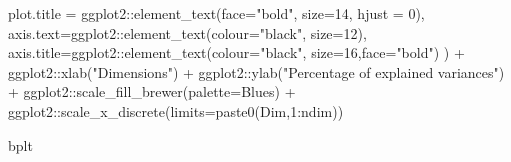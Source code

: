 \documentclass[
]{article}
\newenvironment{Shaded}{\begin{snugshade}}{\end{snugshade}}
\newcommand{\AttributeTok}[1]{\textcolor[rgb]{0.77,0.63,0.00}{#1}}
\newcommand{\DecValTok}[1]{\textcolor[rgb]{0.00,0.00,0.81}{#1}}
\newcommand{\FunctionTok}[1]{\textcolor[rgb]{0.00,0.00,0.00}{#1}}
\newcommand{\NormalTok}[1]{#1}
\newcommand{\SpecialCharTok}[1]{\textcolor[rgb]{0.00,0.00,0.00}{#1}}
\newcommand{\StringTok}[1]{\textcolor[rgb]{0.31,0.60,0.02}{#1}}
\begin{document}
\begin{Shaded}
\begin{Highlighting}[]
    \AttributeTok{plot.title =}\NormalTok{ ggplot2}\SpecialCharTok{::}\FunctionTok{element\_text}\NormalTok{(}\AttributeTok{face=}\StringTok{"bold"}\NormalTok{, }\AttributeTok{size=}\DecValTok{14}\NormalTok{, }\AttributeTok{hjust =} \DecValTok{0}\NormalTok{),}
    \AttributeTok{axis.text=}\NormalTok{ggplot2}\SpecialCharTok{::}\FunctionTok{element\_text}\NormalTok{(}\AttributeTok{colour=}\StringTok{"black"}\NormalTok{, }\AttributeTok{size=}\DecValTok{12}\NormalTok{),}
    \AttributeTok{axis.title=}\NormalTok{ggplot2}\SpecialCharTok{::}\FunctionTok{element\_text}\NormalTok{(}\AttributeTok{colour=}\StringTok{"black"}\NormalTok{, }\AttributeTok{size=}\DecValTok{16}\NormalTok{,}\AttributeTok{face=}\StringTok{"bold"}\NormalTok{)}
\NormalTok{  ) }\SpecialCharTok{+}
\NormalTok{  ggplot2}\SpecialCharTok{::}\FunctionTok{xlab}\NormalTok{(}\StringTok{"Dimensions"}\NormalTok{) }\SpecialCharTok{+}\NormalTok{ ggplot2}\SpecialCharTok{::}\FunctionTok{ylab}\NormalTok{(}\StringTok{"Percentage of explained variances"}\NormalTok{) }\SpecialCharTok{+}
\NormalTok{  ggplot2}\SpecialCharTok{::}\FunctionTok{scale\_fill\_brewer}\NormalTok{(}\AttributeTok{palette=}\StringTok{\textquotesingle{}Blues\textquotesingle{}}\NormalTok{) }\SpecialCharTok{+} 
\NormalTok{  ggplot2}\SpecialCharTok{::}\FunctionTok{scale\_x\_discrete}\NormalTok{(}\AttributeTok{limits=}\FunctionTok{paste0}\NormalTok{(}\StringTok{\textquotesingle{}Dim\textquotesingle{}}\NormalTok{,}\DecValTok{1}\SpecialCharTok{:}\NormalTok{ndim))}

\NormalTok{bplt}
\end{Highlighting}
\end{Shaded}
\end{document}
